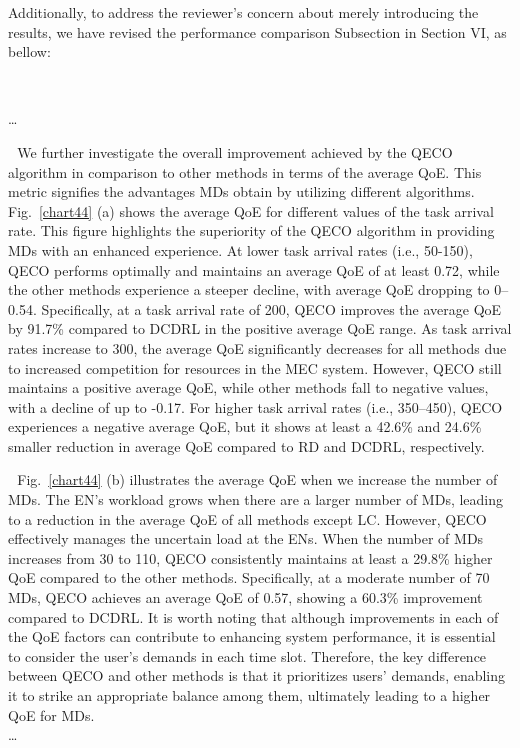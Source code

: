 \documentclass[12pt,draftclsnofoot,onecolumn]{IEEEtran}
\newcommand{\rev}[1]{{\color{blue}#1}} %
\newcommand{\rev}[1]{#1}
\newenvironment{my}[2]%
{\begin{list}{}%
{\setlength{\rightmargin}{#1}\setlength{\leftmargin}{#2}}%


 \item[]{}

} {\end{list}}
\begin{document}
\begin{enumerate}
\begin{my}{1cm}{1cm}
\end{my}

\vspace{5mm}

Additionally, to address the reviewer's concern about merely introducing the results, we have revised the performance comparison Subsection in Section VI, as bellow: 


		\begin{my}{1cm}{1cm}
	\rev{
		{\ 

\dots 
			
\,\,\,\,We further investigate the overall improvement achieved by the QECO algorithm in comparison to other methods in terms of the average QoE. This metric signifies the advantages MDs obtain by utilizing different algorithms. Fig.~\ref{chart44} (a) shows the average QoE for different values of the task arrival rate. This figure highlights the superiority of the QECO algorithm in providing MDs with an enhanced experience. At lower task arrival rates (i.e., 50-150), QECO performs optimally and maintains an average QoE of at least 0.72, while the other methods experience a steeper decline, with average QoE dropping to 0--0.54. Specifically, at a task arrival rate of 200, QECO improves the average QoE by 91.7\% compared to DCDRL in the positive average QoE range. As task arrival rates increase to 300, the average QoE significantly decreases for all methods due to increased competition for resources in the MEC system. However, QECO still maintains a positive average QoE, while other methods fall to negative values, with a decline of up to -0.17. For higher task arrival rates (i.e., 350–450), QECO experiences a negative average QoE, but it shows at least a 42.6\% and 24.6\% smaller reduction in average QoE compared to RD and DCDRL, respectively. \vspace{3mm}



\,\,\,\,Fig.~\ref{chart44} (b) illustrates the average QoE when we increase the number of MDs. The EN's workload grows when there are a larger number of MDs, leading to a reduction in the average QoE of all methods except LC. However, QECO effectively manages the uncertain load at the ENs. When the number of MDs increases from 30 to 110, QECO consistently maintains at least a 29.8\% higher QoE compared to the other methods. Specifically, at a moderate number of 70 MDs, QECO achieves an average QoE of 0.57, showing a 60.3\% improvement compared to DCDRL. It is worth noting that although improvements in each of the QoE factors can contribute to enhancing system performance, it is essential to consider the user's demands in each time slot. Therefore, the key difference between QECO and other methods is that it prioritizes users' demands, enabling it to strike an appropriate balance among them, ultimately leading to a higher QoE for MDs. \vspace{3mm}\\\dots }}


\end{my}
\end{enumerate}
\end{document}
